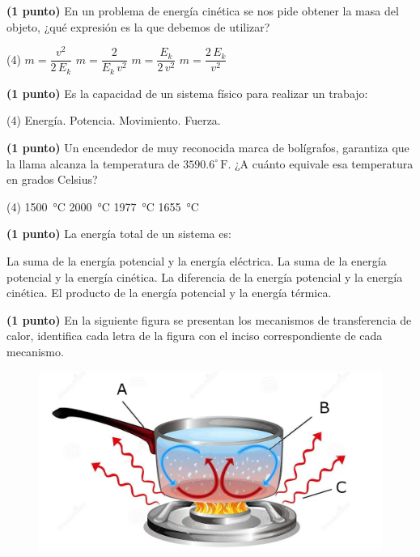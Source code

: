 \documentclass[12pt, letter]{exam}
\newcommand{\Fahrenheit}[1]{${#1}^{\circ} \, \text{F}$}
\begin{document}
\begin{questions}
    \question \textbf{(1 punto)} En un problema de energía cinética se nos pide obtener la masa del objeto, ¿qué expresión es la que debemos de utilizar?
    \begin{tasks}(4)
        \task $m = \dfrac{v^{2}}{2 \, E_{k}}$
        \task $m = \dfrac{2}{E_{k} \, v^{2}}$
        \task $m = \dfrac{E_{k}}{2 \, v^{2}}$
        \task $m = \dfrac{2 \, E_{k}}{v^{2}}$
    \end{tasks}
    \question \textbf{(1 punto)} Es la capacidad de un sistema físico para realizar un trabajo:
    \begin{tasks}(4)
        \task Energía.
        \task Potencia.
        \task Movimiento.
        \task Fuerza.
    \end{tasks}
    \question \textbf{(1 punto)} Un encendedor de muy reconocida marca de bolígrafos, garantiza que la llama alcanza la temperatura de \Fahrenheit{3590.6}. ¿A cuánto equivale esa temperatura en grados Celsius?
    \begin{tasks}(4)
        \task \SI{1500}{\degreeCelsius}
        \task \SI{2000}{\degreeCelsius}
        \task \SI{1977}{\degreeCelsius}
        \task \SI{1655}{\degreeCelsius}
    \end{tasks}
    \question \textbf{(1 punto)} La energía total de un sistema es:
    \begin{tasks}
        \task La suma de la energía potencial y la energía eléctrica.
        \task La suma de la energía potencial y la energía cinética.
        \task La diferencia de la energía potencial y la energía cinética.
        \task El producto de la energía potencial y la energía térmica.
    \end{tasks}
    \question \textbf{(1 punto)} En la siguiente figura se presentan los mecanismos de transferencia de calor, identifica cada letra de la figura con el inciso correspondiente de cada mecanismo.
    \begin{figure}[H]
        \centering
        \includegraphics[scale=0.2]{Transferencia_Calor_01.jpg}

\end{figure}
\end{questions}
\end{document}
